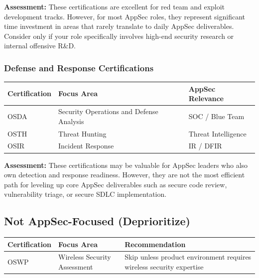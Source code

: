 \documentclass[11pt,letterpaper]{article}
\begin{document}
\textbf{Assessment:} These certifications are excellent for red team and exploit development tracks. However, for most AppSec roles, they represent significant time investment in areas that rarely translate to daily AppSec deliverables. Consider only if your role specifically involves high-end security research or internal offensive R\&D.

\subsubsection{Defense and Response Certifications}

\begin{table}[H]
\centering
\begin{tabularx}{\textwidth}{l >{\raggedright\arraybackslash}X l}
\toprule
\textbf{Certification} & \textbf{Focus Area} & \textbf{AppSec Relevance} \\
\midrule
OSDA & Security Operations and Defense Analysis & SOC / Blue Team \\
OSTH & Threat Hunting & Threat Intelligence \\
OSIR & Incident Response & IR / DFIR \\
\bottomrule
\end{tabularx}
\end{table}

\textbf{Assessment:} These certifications may be valuable for AppSec leaders who also own detection and response readiness. However, they are not the most efficient path for leveling up core AppSec deliverables such as secure code review, vulnerability triage, or secure SDLC implementation.

\subsection{Not AppSec-Focused (Deprioritize)}

\begin{table}[H]
\centering
\begin{tabularx}{\textwidth}{l >{\raggedright\arraybackslash}X l}
\toprule
\textbf{Certification} & \textbf{Focus Area} & \textbf{Recommendation} \\
\midrule
OSWP & Wireless Security Assessment & Skip unless product environment requires wireless security expertise \\
\bottomrule
\end{tabularx}
\end{table}

\newpage
\end{document}
